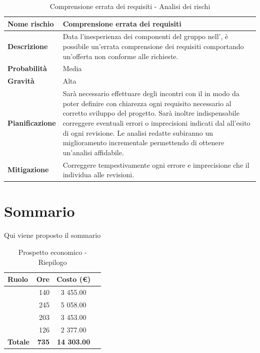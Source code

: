\documentclass[12pt,a4paper]{article}
\begin{document}
\begin{table}[H]
	\begin{center}
		\begin{tabular}{p{} p{}}
			\toprule
			\textbf{Nome rischio} & \textbf{ Comprensione errata dei requisiti} \\
			\midrule
			\midrule
			\textbf{Descrizione} & Data l’inesperienza dei componenti del gruppo nell’\AdR, è possibile un’errata comprensione dei requisiti comportando un’offerta non conforme alle richieste. \\
			\midrule
			\textbf{Probabilità} & Media \\
			\midrule
			\textbf{Gravità} & Alta \\
			\midrule
			\textbf{Pianificazione} &  Sarà necessario effettuare degli incontri con il \mgls{proponente} in modo da poter definire con chiarezza
			ogni requisito necessario al corretto sviluppo del progetto. Sarà inoltre indispensabile correggere eventuali errori o imprecisioni indicati dal \mgls{committente} all’esito di ogni revisione. Le analisi redatte subiranno un miglioramento incrementale permettendo di ottenere un’analisi affidabile. \\
			\midrule
			\textbf{Mitigazione} & Correggere tempestivamente ogni errore e imprecisione che il \mgls{committente} individua alle revisioni. \\
			\bottomrule
		\end{tabular}
		\caption{Comprensione errata dei requisiti - Analisi dei rischi}
	\end{center}
\end{table}

\newpage

\section{Sommario}
Qui viene proposto il sommario 

\begin{table}[H]
	\begin{center}
		\begin{tabular}{l r c r}
			\toprule
			\textbf{Ruolo}	& \textbf{Ore} & \textbf{Costo (\euro)} \\ \midrule
			\midrule
			\FA & 140 & 3 455.00 \\ \midrule
			\FPA & 245 & 5 058.00 \\ \midrule
			\FPDC & 203 & 3 453.00 \\ \midrule
			\FVV & 126 & 2 377.00 \\ \midrule
			\textbf{Totale} & \textbf{735} & \textbf{14 303.00} \\
			\bottomrule
		\end{tabular}
		\caption{Prospetto economico - Riepilogo}
	\end{center}
\end{table}
\end{document}
